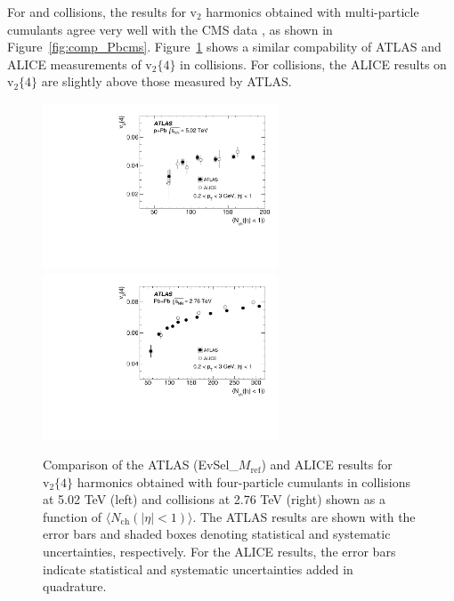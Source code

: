 \documentclass[cernpreprint,texlive=2014,txfonts,UKenglish]{latex/atlasdoc}
\begin{document}
For \pPb and \PbPb collisions, the results for  $\mathrm{v}_2$ harmonics obtained with multi-particle cumulants agree very well with the CMS data \cite{pPbcms3}, as shown in Figure~\ref{fig:comp_Pbcms}.  Figure~\ref{fig:comp_Pbalice} shows a similar compability of ATLAS and ALICE \cite{Alice9} measurements of $\mathrm{v}_2\{4\}$ in \pPb collisions. For \PbPb collisions, the ALICE results on $\mathrm{v}_2\{4\}$  are slightly above those measured by ATLAS.
\begin{figure}[ht!]
\begin{center}
\includegraphics[width=70mm]{fig_16a.pdf}
\includegraphics[width=70mm]{fig_16b.pdf}
\caption{Comparison of  the ATLAS  (EvSel\_$M_{\mathrm{ref}}$) and ALICE \cite{Alice9} results for $\mathrm{v}_2\{4\}$ harmonics obtained with four-particle cumulants in \pPb collisions at 5.02 TeV (left) and \PbPb collisions at 2.76 TeV  (right)  shown as a function of $\langle N_{\mathrm{ch}}(|\eta|<1) \rangle$. The ATLAS results are shown with the error bars and shaded boxes denoting statistical and systematic uncertainties, respectively. For the ALICE results, the error bars indicate statistical and systematic uncertainties added in quadrature.}
\label{fig:comp_Pbalice} 
\end{center}
\end{figure}
\end{document}
